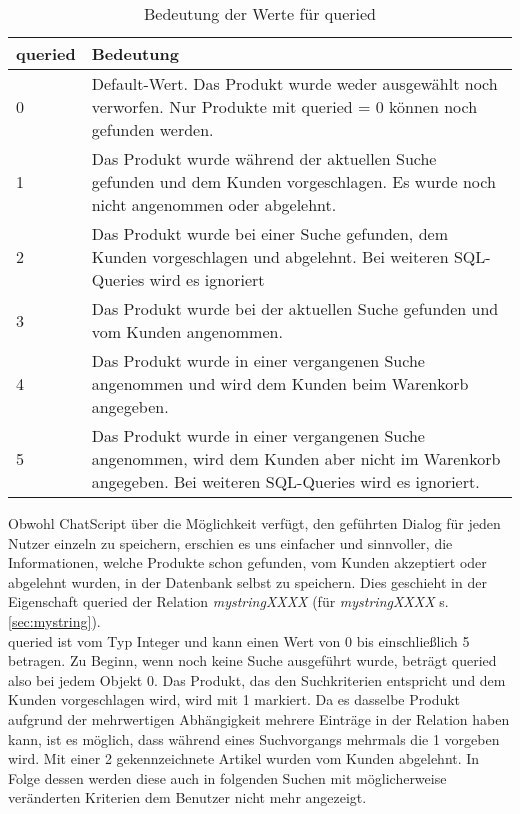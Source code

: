 \begin{table}
\begin{center}
\begin{tabular}{|p{}|p{}|}
	\hline
	queried & Bedeutung \\ \hline
	0 & Default-Wert. Das Produkt wurde weder ausgewählt noch verworfen. Nur Produkte mit queried = 0 können noch gefunden werden. \\ \hline
	1 & Das Produkt wurde während der aktuellen Suche gefunden und dem Kunden vorgeschlagen. Es wurde noch nicht angenommen oder abgelehnt. \\ \hline
	2 & Das Produkt wurde bei einer Suche gefunden, dem Kunden vorgeschlagen und abgelehnt. Bei weiteren SQL-Queries wird es ignoriert\\ \hline
	3 & Das Produkt wurde bei der aktuellen Suche gefunden und vom Kunden angenommen. \\ \hline
	4 & Das Produkt wurde in einer vergangenen Suche angenommen und wird dem Kunden beim Warenkorb angegeben. \\ \hline
	5 & Das Produkt wurde in einer vergangenen Suche angenommen, wird dem Kunden aber nicht im Warenkorb angegeben. Bei weiteren SQL-Queries wird es ignoriert.\\ \hline
	\end{tabular}
	\caption{Bedeutung der Werte für queried}
\end{center}
\label{ÜbersichtQueried}
\end{table}
Obwohl ChatScript über die Möglichkeit verfügt, den geführten Dialog für jeden Nutzer einzeln zu speichern, erschien es uns einfacher und sinnvoller, die Informationen, welche Produkte schon gefunden, vom Kunden akzeptiert oder abgelehnt wurden, in der Datenbank selbst zu speichern. Dies geschieht in der Eigenschaft queried der Relation \textit{mystringXXXX} (für \textit{mystringXXXX} s. \ref{sec:mystring}).\\
queried ist vom Typ Integer und kann einen Wert von 0 bis einschließlich 5 betragen. Zu Beginn, wenn noch keine Suche ausgeführt wurde, beträgt queried also bei jedem Objekt 0. Das Produkt, das den Suchkriterien entspricht und dem Kunden vorgeschlagen wird, wird mit 1 markiert. Da es dasselbe Produkt aufgrund der mehrwertigen Abhängigkeit mehrere Einträge in der Relation haben kann, ist es möglich, dass während eines Suchvorgangs mehrmals die 1 vorgeben wird. Mit einer 2 gekennzeichnete Artikel wurden vom Kunden abgelehnt. In Folge dessen werden diese auch in folgenden Suchen mit möglicherweise veränderten Kriterien dem Benutzer nicht mehr angezeigt. \\
